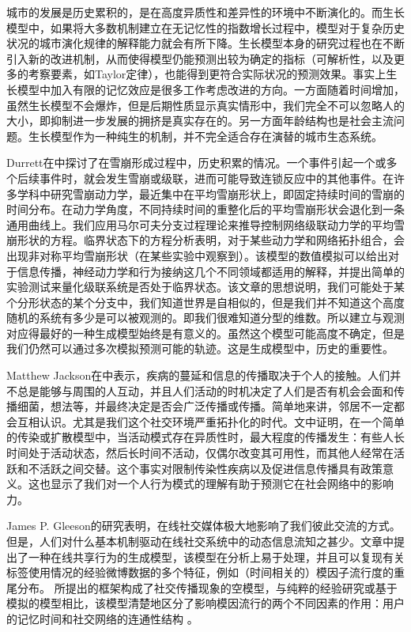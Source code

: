 城市的发展是历史累积的，是在高度异质性和差异性的环境中不断演化的。而生长模型中，如果将大多数机制建立在无记忆性的指数增长过程中，模型对于复杂历史状况的城市演化规律的解释能力就会有所下降。生长模型本身的研究过程也在不断引入新的改进机制，从而使得模型仍能预测出较为确定的指标（可解析性，以及更多的考察要素，如Taylor定律\cite{Giometto7755}），也能得到更符合实际状况的预测效果。事实上生长模型中加入有限的记忆效应是很多工作考虑改进的方向\cite{Schaigorodsky2018}。一方面随着时间增加，虽然生长模型不会爆炸，但是后期性质显示真实情形中，我们完全不可以忽略人的大小，即抑制进一步发展的拥挤是真实存在的。另一方面年龄结构也是社会主流问题。生长模型作为一种纯生的机制，并不完全适合存在演替的城市生态系统。

Durrett在\cite{gleeson2017temporal}中探讨了在雪崩形成过程中，历史积累的情况。一个事件引起一个或多个后续事件时，就会发生雪崩或级联，进而可能导致连锁反应中的其他事件。在许多学科中研究雪崩动力学，最近集中在平均雪崩形状上，即固定持续时间的雪崩的时间分布。在动力学角度，不同持续时间的重整化后的平均雪崩形状会退化到一条通用曲线上。我们应用马尔可夫分支过程理论来推导控制网络级联动力学的平均雪崩形状的方程。临界状态下的方程分析表明，对于某些动力学和网络拓扑组合，会出现非对称平均雪崩形状（在某些实验中观察到）。该模型的数值模拟可以给出对于信息传播，神经动力学和行为接纳这几个不同领域都适用的解释，并提出简单的实验测试来量化级联系统是否处于临界状态。该文章的思想说明，我们可能处于某个分形状态的某个分支中，我们知道世界是自相似的，但是我们并不知道这个高度随机的系统有多少是可以被观测的。即我们很难知道分型的维数。所以建立与观测对应得最好的一种生成模型始终是有意义的。虽然这个模型可能高度不确定，但是我们仍然可以通过多次模拟预测可能的轨迹。这是生成模型中，历史的重要性。

Matthew Jackson在\cite{akbarpour2018diffusion}中表示，疾病的蔓延和信息的传播取决于个人的接触。人们并不总是能够与周围的人互动，并且人们活动的时机决定了人们是否有机会会面和传播细菌，想法等，并最终决定是否会广泛传播或传播。简单地来讲，邻居不一定都会互相认识。尤其是我们这个社交环境严重拓扑化的时代。文中证明，在一个简单的传染或扩散模型中，当活动模式存在异质性时，最大程度的传播发生：有些人长时间处于活动状态，然后长时间不活动，仅偶尔改变其可用性，而其他人经常在活跃和不活跃之间交替。这个事实对限制传染性疾病以及促进信息传播具有政策意义。这也显示了我们对一个人行为模式的理解有助于预测它在社会网络中的影响力。

James P. Gleeson的研究\cite{gleeson2016effects}表明，在线社交媒体极大地影响了我们彼此交流的方式。 但是，人们对什么基本机制驱动在线社交系统中的动态信息流知之甚少。文章中提出了一种在线共享行为的生成模型，该模型在分析上易于处理，并且可以复现有关标签使用情况的经验微博数据的多个特征，例如（时间相关的）模因子流行度的重尾分布。 所提出的框架构成了社交传播现象的空模型，与纯粹的经验研究或基于模拟的模型相比，该模型清楚地区分了影响模因流行的两个不同因素的作用：用户的记忆时间和社交网络的连通性结构 。

